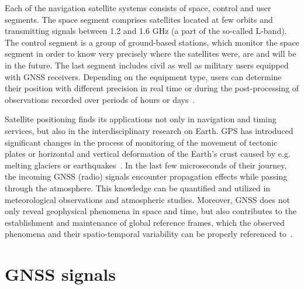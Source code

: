 Each of the navigation satellite systems consists of space, control and user segments. The space segment comprises satellites 
located at few orbits and transmitting signals between 1.2 and 1.6 GHz (a part of the so-called L-band). 
The control segment is a group of ground-based stations, which monitor the space segment in order to 
know very precisely where the satellites were, are and will be in the future. The last segment includes civil as well 
as military users equipped with GNSS receivers. Depending on the equipment type, users can determine their position with 
different precision in real time or during the post-­processing of observations recorded over periods of hours or days~\citep{Teunissen:2017}. \par{}

Satellite positioning finds its applications not only in navigation and timing services, but also in the interdisciplinary 
research on Earth. GPS has introduced significant changes in the process of monitoring of the movement of tectonic plates or horizontal and 
vertical deformation of the Earth's crust caused by e.g. melting glaciers or earthquakes~\citep{Wake2016}. In the last few microseconds 
of their journey, the incoming GNSS (radio) signals 
encounter propagation effects while passing through the atmosphere. This knowledge can be quantified and utilized in meteorological observations 
and atmospheric studies. Moreover, GNSS does not only reveal geophysical phenomena in space and time, but also contributes to the establishment and 
maintenance of global reference frames, which the observed phenomena and their spatio-temporal variability can be properly referenced to~\citep{AltamimiITRF2014}. 


\section{GNSS signals}

